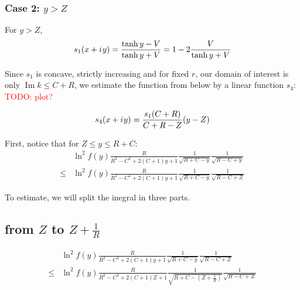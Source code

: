 \documentclass[12pt, a4paper]{article}
\newcommand{\mcO}{\mathcal{O}}
\newcommand{\iu}{{i\mkern1mu}}
\renewcommand{\Im}{\operatorname{Im}}
\newcommand{\todo}[1]{{\large \textcolor{red}{TODO: #1}}}
\begin{document}
\subsubsection*{Case 2: $y > Z$}
For $y > Z$, 
\[
s_1(x + \iu y) 
 = \frac{\tanh y - V}{\tanh y + V}
 = 1 - 2 \frac{V}{\tanh y + V}
\]

Since $s_1$ is concave, strictly increasing and for fixed $r$, our domain of interest is only $\Im k \le C + R$, we estimate the function from below by a linear function $s_4$: \todo{plot?}

\[
s_4(x + \iu y) = 
\frac{s_1(C + R)}{C + R - Z} (y - Z)
\]




First, notice that for $Z \le y \le R + C$:
\begin{align*}
    & \ln^2 f(y) \frac{R}{R^2 - C^2 + 2 (C + 1) y + 1} \frac{1}{\sqrt{R + C - y}} \frac{1}{\sqrt{R - C + y}} \\
\le & \ln^2 f(y) \frac{R}{R^2 - C^2 + 2 (C + 1) y + 1} \frac{1}{\sqrt{R + C - y}} \frac{1}{\sqrt{R - C + Z}}
\end{align*}


To estimate, we will split the inegral in three parts.

\subsection*{from $Z$ to $Z + \frac{1}{R}$}

\begin{align*}
       & \ln^2 f(y) \frac{R}{R^2 - C^2 + 2 (C + 1) y + 1} \frac{1}{\sqrt{R + C - y}} \frac{1}{\sqrt{R - C + Z}}
\\ \le & \ln^2 f(y) \frac{R}{R^2 - C^2 + 2 (C + 1) Z + 1} \frac{1}{\sqrt{R + C - (Z + \frac{1}{R})}} \frac{1}{\sqrt{R - C + Z}}
\end{align*}
\end{document}
